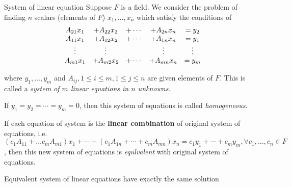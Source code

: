 \documentclass[8pt]{beamer}
\newcommand{\tb}[1]{\textbf{#1}}
\newcommand{\ti}[1]{\textit{#1}}
\begin{document}
\begin{frame}{System of linear equation}
  Suppose $F$ is a field. We consider the problem of finding $n$ scalars (elements of $F$) $x_1, \dots, x_n$ which satisfy the conditions of 
  \begin{equation}\label{eq:1}
    \begin{array}{ccccc}
      A_{21}x_1 &+ A_{22}x_2  &+ \cdots &+ A_{2n}x_n & = y_2\\
      A_{11}x_1 &+ A_{12}x_2  &+ \cdots &+ A_{1n}x_n & = y_1\\
      \vdots    &  \vdots     &\empty    & \vdots          & \vdots\\
      A_{m1}x_1 &+ A_{m2}x_2  &+ \cdots &+ A_{mn}x_n & = y_m
    \end{array}
  \end{equation}

  where $y_1, \dots, y_m$ and $A_{ij}, 1\leq i\leq m, 1 \leq j \leq n $ are given elements of $F$. This is called a \ti{system of $m$ linear equations in $n$ unknowns}.

  \bigskip
  If $y_1 = y_2 =  \cdots = y_m = 0$, then this system of equations is called \ti{homogeneous}.

  \bigskip
  If each equation of system is the \tb{linear combination} of original system of equations, i.e. $(c_1 A_{11} + \dots  c_m A_{m1})x_1 + \cdots +(c_1 A_{1n} + \cdots + c_m A_{mn}  )x_n = c_1 y_1 + \cdots +c_m y_m, \forall c_1, \dots, c_n \in F$, then this new system of equations is \ti{equlvalent} with original system of equations.

  \begin{theorem}
    Equivalent system of linear equations have exactly the same solution
  \end{theorem}
\end{frame}
\end{document}
